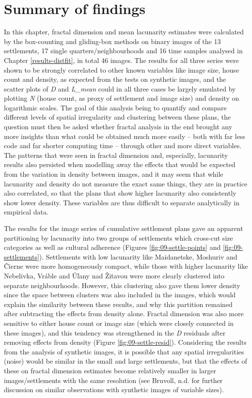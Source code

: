 \documentclass[
  12pt,
]{book}
\begin{document}
\hypertarget{summary-of-findings-1}{%
\section{Summary of findings}\label{summary-of-findings-1}}

In this chapter, fractal dimension and mean lacunarity estimates were calculated by the box-counting and gliding-box methods on binary images of the 13 settlements, 17 single quarters/neighbourhoods and 16 time samples analysed in Chapter \ref{results-distfit}, in total 46 images. The results for all three series were shown to be strongly correlated to other known variables like image size, house count and density, as expected from the tests on synthetic images, and the scatter plots of \emph{D} and \emph{L\_mean} could in all three cases be largely emulated by plotting \emph{N} (house count, as proxy of settlement and image size) and density on logarithmic scales. The goal of this analysis being to quantify and compare different levels of spatial irregularity and clustering between these plans, the question must then be asked whether fractal analysis in the end brought any more insights than what could be obtained much more easily -- both with far less code and far shorter computing time -- through other and more direct variables. The patterns that were seen in fractal dimension and, especially, lacunarity results also persisted when modelling away the effects that would be expected from the variation in density between images, and it may seem that while lacunarity and density do not measure the exact same things, they are in practice also correlated, so that the plans that show higher lacunarity also consistently show lower density. These variables are thus difficult to separate analytically in empirical data.

The results for the image series of cumulative settlement plans gave an apparent partitioning by lacunarity into two groups of settlements which cross-cut size categories as well as cultural adherence (Figures \ref{fig:09-settle-points} and \ref{fig:09-settlements}). Settlements with low lacunarity like Maidanetske, Moshuriv and Čierne were more homogeneously compact, while those with higher lacunarity like Nebelivka, Vráble and Úľany nad Žitavou were more clearly clustered into separate neighbourhoods. However, this clustering also gave them lower density since the space between clusters was also included in the images, which would explain the similarity between these results, and why this partition remained after subtracting the effects from density alone. Fractal dimension was also more sensitive to either house count or image size (which were closely connected in these images), and this tendency was strengthened in the \emph{D} residuals after removing effects from density (Figure \ref{fig:09-settle-resid}). Considering the results from the analysis of synthetic images, it is possible that any spatial irregularities (noise) would be similar in the small and large settlements, but that the effects of these on fractal dimension estimates become relatively smaller in larger images/settlements with the same resolution (see Bruvoll, n.d. for further discussion on similar observations with synthetic images of variable sizes).
\end{document}

